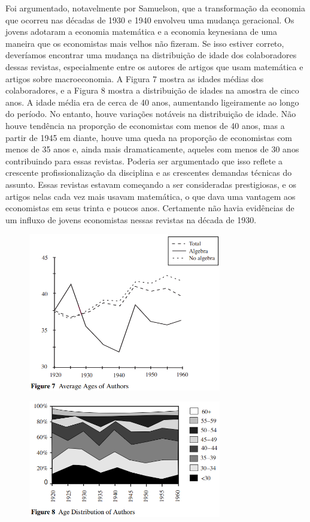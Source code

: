 \documentclass[12pt]{article}
\begin{document}
Foi argumentado, notavelmente por Samuelson, que a transformação da economia que ocorreu nas décadas de 1930 e 1940 envolveu uma mudança geracional. Os jovens adotaram a economia matemática e a economia keynesiana de uma maneira que os economistas mais velhos não fizeram. Se isso estiver correto, deveríamos encontrar uma mudança na distribuição de idade dos colaboradores dessas revistas, especialmente entre os autores de artigos que usam matemática e artigos sobre macroeconomia. A Figura 7 mostra as idades médias dos colaboradores, e a Figura 8 mostra a distribuição de idades na amostra de cinco anos. A idade média era de cerca de 40 anos, aumentando ligeiramente ao longo do período. No entanto, houve variações notáveis na distribuição de idade. Não houve tendência na proporção de economistas com menos de 40 anos, mas a partir de 1945 em diante, houve uma queda na proporção de economistas com menos de 35 anos e, ainda mais dramaticamente, aqueles com menos de 30 anos contribuindo para essas revistas. Poderia ser argumentado que isso reflete a crescente profissionalização da disciplina e as crescentes demandas técnicas do assunto. Essas revistas estavam começando a ser consideradas prestigiosas, e os artigos nelas cada vez mais usavam matemática, o que dava uma vantagem aos economistas em seus trinta e poucos anos. Certamente não havia evidências de um influxo de jovens economistas nessas revistas na década de 1930.

\begin{figure}[H]
    \centering
    \includegraphics[width=0.75\textwidth]{figure 7.png}
    \end{figure}

\begin{figure}[H]
    \centering
    \includegraphics[width=0.75\textwidth]{figure 8.png}
    \end{figure}
\end{document}
